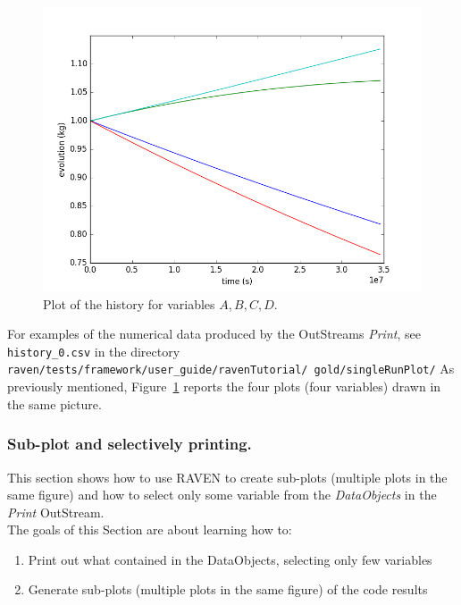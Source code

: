 \begin{figure}[h!]
  \centering
  \includegraphics[scale=0.7]{../../tests/framework/user_guide/ravenTutorial/gold/singleRunPlot/1-historyPlot_line-line-line-line.png}
  \caption{Plot of the history for variables $A,B,C,D$.}
  \label{fig:historyPlotLine}
\end{figure}

For examples of the numerical data produced by the OutStreams \textit{Print}, see \texttt{history\_0.csv} in the directory
 \texttt{raven/tests/framework/user\_guide/ravenTutorial/ gold/singleRunPlot/}
 As previously mentioned, Figure~\ref{fig:historyPlotLine} reports the four plots (four variables) drawn in the same picture.

\subsubsection{Sub-plot and selectively printing.}
This section shows how to use RAVEN to create sub-plots (multiple plots in the same figure) and
how to select only some variable from the \textit{DataObjects} in the \textit{Print} OutStream.
 \\ The goals of this Section are about learning how to:
 \begin{enumerate}
   \item Print out what contained in the DataObjects, selecting only few variables
   \item Generate sub-plots (multiple plots in the same figure) of the code results
\end{enumerate}

